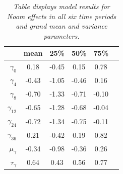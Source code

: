 \documentclass{article}
\begin{document}
\begin{table}[H]
\centering
\begin{tabular}{r c c c c c}
  \hline
 & mean & 25\% & 50\% & 75\%\\ 
  \hline
  $\gamma_0$ & 0.18 & -0.45 & 0.15 & 0.78  \\ 
  $\gamma_4$ & -0.43 & -1.05 & -0.46 & 0.16 \\ 
  $\gamma_8$ & -0.70 & -1.33 & -0.71 & -0.10 \\  
  $\gamma_{12}$ & -0.65 & -1.28 & -0.68 & -0.04 \\  
  $\gamma_{24}$ & -0.72 & -1.34 & -0.75 & -0.11 \\  
  $\gamma_{36}$ & 0.21 & -0.42 & 0.19 & 0.82 \\ 
  \hline \hline
  $\mu_{\gamma}$ & -0.34 & -0.98 & -0.36 & 0.26 \\ 
  $\tau_{\gamma}$ & 0.64 & 0.43 & 0.56 & 0.77 \\ 
   \hline
\end{tabular}
\caption{\emph{Table displays model results for Noom effects in all six time periods and grand mean and variance parameters.}}
\end{table}
\end{document}

